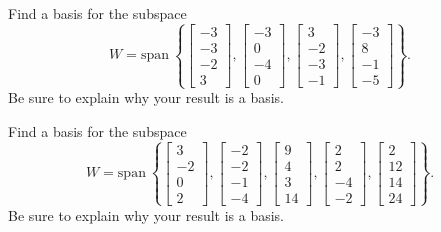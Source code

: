 \documentclass{article}
\begin{document}
\begin{exerciseStatement}
    Find a basis for the subspace
\[W=\mathrm{span}\ \left\{\left[\begin{array}{r}
-3 \\
-3 \\
-2 \\
3
\end{array}\right] , \left[\begin{array}{r}
-3 \\
0 \\
-4 \\
0
\end{array}\right] , \left[\begin{array}{r}
3 \\
-2 \\
-3 \\
-1
\end{array}\right] , \left[\begin{array}{r}
-3 \\
8 \\
-1 \\
-5
\end{array}\right]\right\}.\]
 Be sure to explain why your result is a basis.


  
\end{exerciseStatement}

\begin{exerciseStatement}
    Find a basis for the subspace
\[W=\mathrm{span}\ \left\{\left[\begin{array}{r}
3 \\
-2 \\
0 \\
2
\end{array}\right] , \left[\begin{array}{r}
-2 \\
-2 \\
-1 \\
-4
\end{array}\right] , \left[\begin{array}{r}
9 \\
4 \\
3 \\
14
\end{array}\right] , \left[\begin{array}{r}
2 \\
2 \\
-4 \\
-2
\end{array}\right] , \left[\begin{array}{r}
2 \\
12 \\
14 \\
24
\end{array}\right]\right\}.\]
 Be sure to explain why your result is a basis.


  
\end{exerciseStatement}
\end{document}
